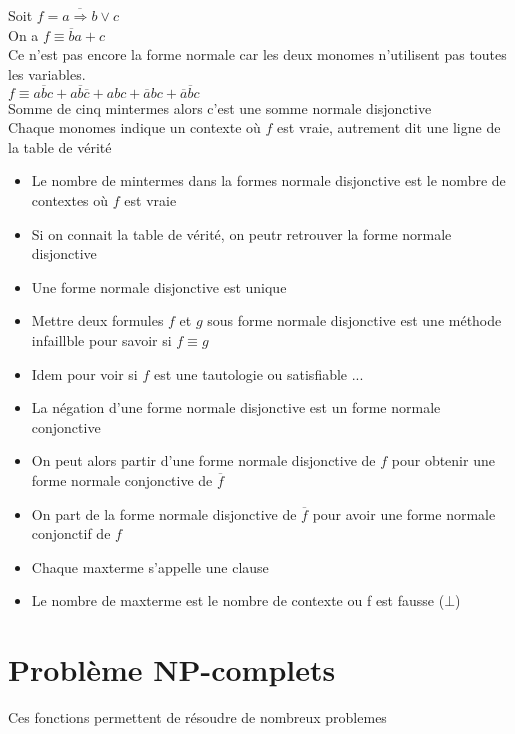 \begin{ex}
    Soit $f=\overline{a\Rightarrow b} \lor c$\\
    On a $f\equiv \overline{b}a+c$ \\
    Ce n'est pas encore la forme normale car les deux monomes n'utilisent pas toutes les variables.\\

    $f\equiv a\overline{b}c+a\overline{b}\overline{c}+abc+\overline{a}bc+\overline{a}\overline{b}c$ \\
    Somme de cinq mintermes alors c'est une somme normale disjonctive\\
    Chaque monomes indique un contexte où $f$ est vraie, autrement dit une ligne de la table de vérité\\
\end{ex}

\begin{itemize}
    \item Le nombre de mintermes dans la formes normale disjonctive est le nombre de contextes où $f$ est vraie
    \item Si on connait la table de vérité, on peutr retrouver la forme normale disjonctive
    \item Une forme normale disjonctive est unique
    \item Mettre deux formules $f$ et $g$ sous forme normale disjonctive est une méthode infaillble pour savoir si $f\equiv g$
    \item Idem pour voir si $f$ est une tautologie ou satisfiable ...
    \item La négation d'une forme normale disjonctive est un forme normale conjonctive
    \item On peut alors partir d'une forme normale disjonctive de $f$ pour obtenir une forme normale conjonctive de $\overline f$
    \item On part de la forme normale disjonctive de $\overline f$ pour avoir une forme normale conjonctif de $f$
    \item Chaque maxterme s'appelle une clause
    \item Le nombre de maxterme est le nombre de contexte ou f est fausse ($\bot$)
\end{itemize}

\section{Problème NP-complets}

Ces fonctions permettent de résoudre de nombreux problemes


